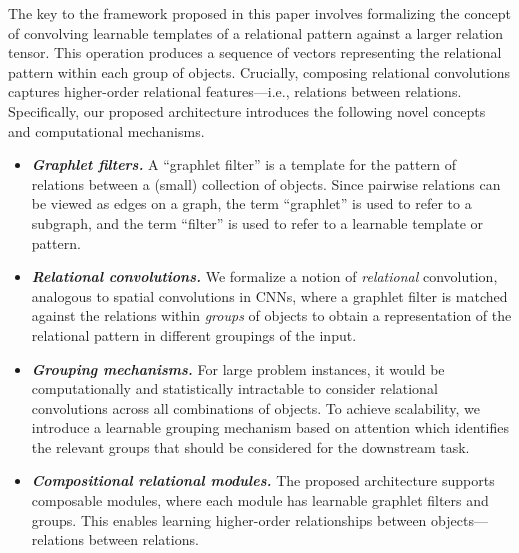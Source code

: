 The key to the framework proposed in this paper involves formalizing the concept of convolving learnable templates of a relational pattern against a larger relation tensor. This operation produces a sequence of vectors representing the relational pattern within each group of objects. Crucially, composing relational convolutions captures higher-order relational features---i.e., relations between relations. Specifically, our proposed architecture introduces the following novel concepts and computational mechanisms.
\begin{itemize}%
    \item \textit{\bfseries Graphlet filters.} A ``graphlet filter'' is a template for the pattern of relations between a (small) collection of objects. 
    Since pairwise relations can be viewed as edges on a graph, the term ``graphlet'' is used to refer to a subgraph, and the term ``filter'' is used to refer to a learnable template or pattern.
    \item \textit{\bfseries Relational convolutions.} 
    We formalize a notion of \textit{relational} convolution, analogous to spatial convolutions in CNNs, where a graphlet filter is matched against the relations within \textit{groups} of objects to obtain a representation of the relational pattern in different groupings of the input.
    \item \textit{\bfseries Grouping mechanisms.} For large problem instances, it would be computationally and statistically intractable to consider relational convolutions across all combinations of objects. To achieve scalability, we introduce a learnable grouping mechanism based on attention which identifies the relevant groups that should be considered for the downstream task.
    \item \textit{\bfseries Compositional relational modules.} The proposed architecture supports composable modules, where each module has learnable graphlet filters and groups. This enables learning higher-order relationships between objects---relations between relations.
\end{itemize}


